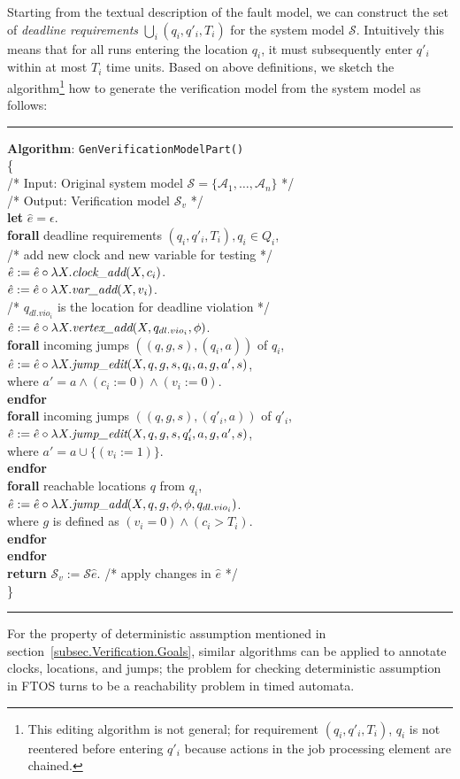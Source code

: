 \documentclass[10pt, a4paper, onecolumn, conference, compsocconf]{IEEEtran}
\newcommand{\procbegin}{\vspace*{3mm}\hrule\vspace{2mm}\noindent}
\newcommand{\procend}{\vspace*{2mm}\hrule\vspace{3mm}}
\newcommand{\hstt}{\\\hspace*{4mm}}
\newcommand{\hstttt}{\\\hspace*{8mm}}
\newcommand{\hstttttt}{\\\hspace*{12mm}}
\newcommand{\hstttttttt}{\\\hspace*{16mm}}
\newcommand{\emvadd}{\mbox{\em vertex\_add}}
\newcommand{\emcadd}{\mbox{\em clock\_add}}
\newcommand{\emvaradd}{\mbox{\em var\_add}}
\newcommand{\emjadd}{\mbox{\em jump\_add}}
\newcommand{\emjedt}{\mbox{\em jump\_edit}}
\begin{document}
Starting from the textual description of the fault model, we can construct the set of \emph{deadline requirements} $\bigcup_i(q_i,q'_i,T_i)$ for the system
model $\mathcal{S}$. Intuitively this means that for all runs entering the location $q_i$, it must subsequently enter $q'_i$ within at most $T_i$ time units.
Based on above definitions, we sketch the algorithm\footnote{This editing algorithm is not general;  for requirement $(q_i,q'_i,T_i)$, $q_i$ is not reentered before entering $q'_i$ because actions in the job processing element are chained.} how to generate the verification model from the system model as follows:
\begin{small}
\procbegin
\textbf{Algorithm}: \verb"GenVerificationModelPart()"\\
\{
\hstt /* Input: Original system model $\mathcal{S}=\{\mathcal{A}_1, \ldots , \mathcal{A}_n\}$ */
\hstt /* Output: Verification model $\mathcal{S}_v$ */
\hstt \textbf{let} $\hat{e}=\epsilon$.
\hstt \textbf{forall} deadline requirements $(q_i,q'_i,T_i), q_i \in Q_i$,
\hstt /* add new clock and new variable for testing */
\hstttt$\hat{e}:=\hat{e} \circ \lambda X.\emcadd(X ,c_i)$.
\hstttt$\hat{e}:=\hat{e} \circ \lambda X.\emvaradd(X ,v_i)$.
\hstt /* $q_{dl.vio_i}$ is the location for deadline violation */
\hstttt$\hat{e}:=\hat{e} \circ \lambda X.\emvadd(X ,q_{dl.vio_i},\phi)$.
\hstttt \textbf{forall} incoming jumps $((q,g,s),(q_i,a))$ of $q_i$,
\hstttttt $\hat{e}:=\hat{e} \circ \lambda X.\emjedt(X ,q,g,s,q_i,a, g, a',s)$,
\hstttttttt where $a'= a \wedge (c_i := 0)\wedge(v_i:=0)$.
\hstttt \textbf{endfor}
\hstttt \textbf{forall} incoming jumps $((q,g,s),(q'_i,a))$ of $q'_i$,
\hstttttt $\hat{e}:=\hat{e} \circ \lambda X.\emjedt(X ,q,g,s,q'_i,a, g, a',s)$,
\hstttttttt where $a' = a \cup\{(v_i:=1)\}$.
\hstttt \textbf{endfor}
\hstttt \textbf{forall} reachable locations $q$ from $q_i$,
\hstttttt $\hat{e}:=\hat{e} \circ \lambda X.\emjadd(X ,q,g,\phi,\phi, q_{dl.vio_i})$.
\hstttttttt where $g$ is defined as $(v_i = 0) \wedge (c_i>T_i)$.
\hstttt \textbf{endfor}
\hstt \textbf{endfor}
\hstt \textbf{return} $\mathcal{S}_v := \mathcal{S}\hat{e}$. /* apply changes in $\hat{e}$ */
\\\}
\procend
\end{small}

For the property of deterministic assumption mentioned in section~\ref{subsec.Verification.Goals}, similar algorithms can be applied to annotate clocks, locations, and jumps; the problem for checking deterministic assumption in FTOS turns to be a reachability problem in timed automata.
\end{document}
